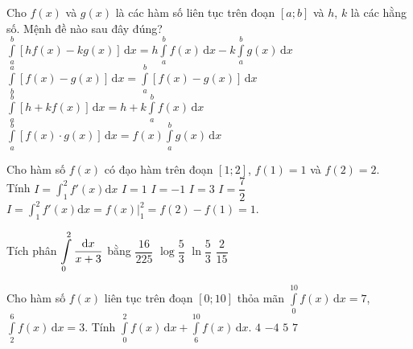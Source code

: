 \begin{ex}%
	Cho $f(x)$ và $g(x)$ là các hàm số liên tục trên đoạn $[a;b]$ và $h$, $k$ là các hằng số. Mệnh đề nào sau đây đúng?
	\choice
	{\True $\displaystyle\int\limits_a^b \left[hf(x)-kg(x)\right]\mathrm{\,d}x=h\displaystyle\int\limits_a^b f(x)\mathrm{\,d}x-k\displaystyle\int\limits_a^b g(x)\mathrm{\,d}x$}
	{$\displaystyle\int\limits_b^a \left[f(x)-g(x)\right]\mathrm{\,d}x=\displaystyle\int\limits_a^b \left[f(x)-g(x)\right]\mathrm{\,d}x$}
	{$\displaystyle\int\limits_a^b [h+kf(x)]\mathrm{\,d}x=h+k\displaystyle\int\limits_a^b f(x)\mathrm{\,d}x$}
	{$\displaystyle\int\limits_a^b \left[f(x)\cdot g(x)\right]\mathrm{\,d}x=f(x)\displaystyle\int\limits_a^b g(x)\mathrm{\,d}x$}
\end{ex}
\begin{ex}%
	Cho hàm số $f( x)$ có đạo hàm trên đoạn $[ 1;2]$, $f( 1)=1$ và $f( 2)=2$. \\
	Tính $I=\displaystyle\int_{1}^{2}
	f'(x) \mathrm{d}x$
	\choice
	{\True $I=1$}
	{$I=-1$}
	{$I=3$}
	{$I=\dfrac{7}{2}$}
	\loigiai
	{$I=\displaystyle\int_{1}^{2}
		f'(x) \mathrm{d}x =f(x)\bigg|_{1}^{2}=f(2)-f(1)=1$.}
\end{ex}
\begin{ex}%
	Tích phân $\displaystyle\int\limits_0^2\dfrac{{\rm d}x}{x+3}$ bằng
	\choice
	{$\dfrac{16}{225}$}
	{$\log \dfrac{5}{3}$}
	{\True $\ln \dfrac{5}{3}$}
	{$\dfrac{2}{15}$}
\end{ex}
\begin{ex}%
		Cho hàm số $f(x)$ liên tục trên đoạn $[0;10]$ thỏa mãn $\displaystyle\int\limits_0^{10} f(x) \mathrm{\,d}x=7$, $\displaystyle\int\limits_2^6 f(x) \mathrm{\,d}x=3$. Tính $\displaystyle\int\limits_0^2 f(x) \mathrm{\,d}x+\displaystyle\int\limits_6^{10} f(x) \mathrm{\,d}x$.
		\choice
		{\True  $4$}
		{$-4$}
		{ $5$}
		{ $7$}
	\end{ex}
